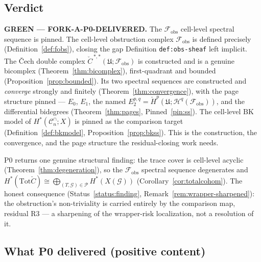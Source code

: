 \documentclass[11pt,oneside]{amsart}
\theoremstyle{plain}
\theoremstyle{definition}
\theoremstyle{remark}
\theoremstyle{honeststyle}
\newcommand{\G}{\mathcal{G}}
\newcommand{\Cn}{\mathcal{C}^{\cap}_n}
\newcommand{\BK}{\mathrm{BK}}
\newcommand{\Tot}{\mathrm{Tot}}
\newcommand{\fobs}{\mathcal{F}_{\mathrm{obs}}}
\newcommand{\Pp}{\mathcal{P}}
\newcommand{\Uf}{\mathfrak{U}}
\newcommand{\Ccheck}{\check{C}}
\begin{document}
\subsection{Verdict}
\label{ssec:verdict}

\textbf{GREEN --- FORK-A-P0-DELIVERED.} The $\fobs$ cell-level
spectral sequence is pinned. The cell-level obstruction complex
$\fobs$ is defined precisely (Definition~\ref{def:fobs}), closing the
gap Definition \texttt{def:obs-sheaf} left implicit. The \v{C}ech
double complex $\Ccheck^{\,*,*}(\Uf;\fobs)$ is constructed and is a
genuine bicomplex (Theorem~\ref{thm:bicomplex}), first-quadrant and
bounded (Proposition~\ref{prop:bounded}). Its two spectral sequences
are constructed and \emph{converge} strongly and finitely
(Theorem~\ref{thm:convergence}), with the page structure pinned ---
$E_{0}$, $E_{1}$, the named $E_{2}^{p,q}=\check H^{p}(\Uf;\mathcal
H^{q}(\fobs))$, and the differential bidegrees
(Theorem~\ref{thm:pages}, Pinned~\ref{pin:ss}). The cell-level $\BK$
model of $H^{*}(\Cn;X)$ is pinned as the comparison target
(Definition~\ref{def:bkmodel}, Proposition~\ref{prop:bkss}). This is
the construction, the convergence, and the page structure the
residual-closing work needs.

P0 returns one genuine structural finding: the trace cover is
cell-level acyclic (Theorem~\ref{thm:degeneration}), so the $\fobs$
spectral sequence degenerates and $H^{*}(\Tot\Ccheck)\cong
\bigoplus_{(T,\G)\in\Pp}H^{*}(X(\G))$ (Corollary~\ref{cor:totalcohom}).
The honest consequence (Status~\ref{status:finding},
Remark~\ref{rem:wrapper-sharpened}): the obstruction's non-triviality
is carried entirely by the comparison map, residual R3 --- a
sharpening of the wrapper-risk localization, not a resolution of it.

\subsection{What P0 delivered (positive content)}
\label{ssec:delivered}
\end{document}

